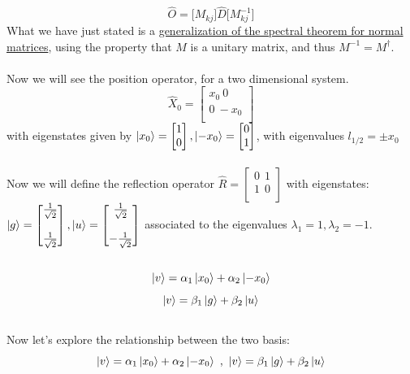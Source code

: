 \documentclass{article}
\begin{document}
  $$ \hat{O} =  \Bigr[M_{kj} \Bigr] \hat{D} \Bigr[ M_{kj}^{-1} \Bigr] $$
  What we have just stated is a \href{https://en.wikipedia.org/wiki/Spectral_theorem#Normal_matrices}{generalization of the spectral theorem for normal matrices}, using the property that $M$ is a unitary matrix, and thus $M^{-1} = M^{\dag}$.\\ \\
Now we will see the position operator, for a two dimensional system. 
$$ \hat{X}_0 = \begin{bmatrix}
    x_0 \ 0 \\
    0    \ -x_0 \\
\end{bmatrix}$$
with eigenstates given by $ \ket{x_0} = \begin{bmatrix}
    1 \\
    0 \\
\end{bmatrix} , \ket{-x_0} = \begin{bmatrix}
    0 \\
    1 \\
\end{bmatrix} $, with eigenvalues $l_{1/2} = \pm x_0$ \\ \\ 
Now we will define the reflection operator $\hat{R} = \begin{bmatrix}
    0 \ \ 1 \\
    1\  \ 0 \\
\end{bmatrix}$ with eigenstates: \\$ \ket{g} = \begin{bmatrix}
\frac{1}{\sqrt2} \\ \\
\frac{1}{\sqrt2}
\end{bmatrix}, \ket{u} = \begin{bmatrix}
    \frac{1}{\sqrt2} \\ \\
    -\frac{1}{\sqrt2}
\end{bmatrix}$ associated to the eigenvalues $ \lambda_1 = 1, \lambda_2 = -1$. \\  \\
$$\ket{v} = \alpha_1 \ket{x_0} + \alpha_2 \ket{-x_0}$$
$$\ket{v} = \beta_1 \ket{g} + \beta_2 \ket{u}$$ \\
Now let's explore the relationship between the two basis:\\
$$\ket{v} = \alpha_1 \ket{x_0} + \alpha_2 \ket{-x_0} \ , \
\ket{v} = \beta_1 \ket{g}  + \beta_2 \ket{u} $$ 
\end{document}
